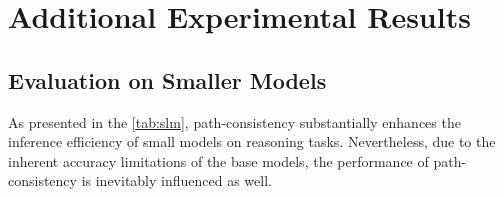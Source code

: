 \appendix

\section{Additional Experimental Results}\label{app:additional-results}

\subsection{Evaluation on Smaller Models}
\label{app:small-model}

As presented in the \cref{tab:slm}, path-consistency substantially enhances the inference efficiency of small models on reasoning tasks. Nevertheless, due to the inherent accuracy limitations of the base models, the performance of path-consistency is inevitably influenced as well.

\begin{table}[h]
\caption{Evaluation results of different inference techniques on Llama-3.2-1B-Instruct.}
\label{tab:slm}
\centering
{}
\end{table}

